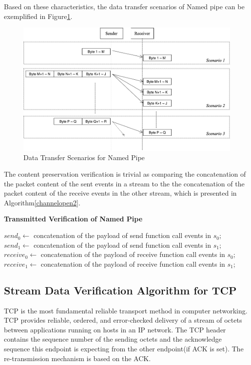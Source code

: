 Based on these characteristics, the data transfer scenarios of Named pipe can be exemplified in Figure\ref{namedpipe}. 
\begin{figure}[H]
\centerline{\includegraphics[scale=0.4]{Figures/namedpipe}}
\caption{Data Transfer Scenarios for Named Pipe}
\label{namedpipe}
\end{figure}

The content preservation verification is trivial as comparing the concatenation of the packet content of the sent events in a stream to the the concatenation of the packet content of the receive events in the other stream, which is presented in Algorithm\ref{channelopen2}.

\begin{algorithm}[H]
\DontPrintSemicolon
\caption{{\bf Transmitted Verification of Named Pipe} \label{dataAlg1}}
\;
$send_0 \leftarrow$ concatenation of the payload of send function call events in $s_0$;\;
$send_1 \leftarrow$ concatenation of the payload of send function call events in $s_1$;\;
$receive_0 \leftarrow$ concatenation of the payload of receive function call events in $s_0$;\;
$receive_1 \leftarrow$ concatenation of the payload of receive function call events in $s_1$;\;
\end{algorithm} 

\subsection{Stream Data Verification Algorithm for TCP}
TCP is the most fundamental reliable transport method in computer networking. TCP provides reliable, ordered, and error-checked delivery of a stream of octets between applications running on hosts in an IP network. The TCP header contains the sequence number of the sending octets and the acknowledge sequence this endpoint is expecting from the other endpoint(if ACK is set). The re-transmission mechanism is based on the ACK. 

